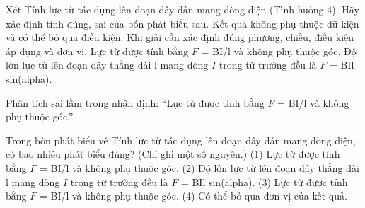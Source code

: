 \begin{ex}
Xét Tính lực từ tác dụng lên đoạn dây dẫn mang dòng điện (Tình huống 4). Hãy xác định tính đúng, sai của bốn phát biểu sau.
\choiceTF
{Kết quả không phụ thuộc dữ kiện và có thể bỏ qua điều kiện.}
{\True Khi giải cần xác định đúng phương, chiều, điều kiện áp dụng và đơn vị.}
{Lực từ được tính bằng $F$ = BI/l và không phụ thuộc góc.}
{\True Độ lớn lực từ lên đoạn dây thẳng dài l mang dòng $I$ trong từ trường đều là $F$ = BIl sin(alpha).}
\end{ex}

\begin{bt}
Phân tích sai lầm trong nhận định: “Lực từ được tính bằng $F$ = BI/l và không phụ thuộc góc.”
\end{bt}

\begin{ex}
Trong bốn phát biểu về Tính lực từ tác dụng lên đoạn dây dẫn mang dòng điện, có bao nhiêu phát biểu đúng? (Chỉ ghi một số nguyên.) (1) Lực từ được tính bằng $F$ = BI/l và không phụ thuộc góc. (2) Độ lớn lực từ lên đoạn dây thẳng dài l mang dòng $I$ trong từ trường đều là $F$ = BIl sin(alpha). (3) Lực từ được tính bằng $F$ = BI/l và không phụ thuộc góc. (4) Có thể bỏ qua đơn vị của kết quả.
\end{ex}


